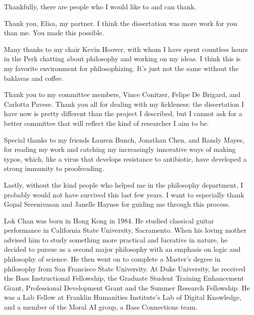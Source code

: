 \documentclass[PhD]{dukethesis2006}
\begin{document}
Thankfully, there are people who I would like to and can thank.

Thank you, Elisa, my partner. I think the dissertation was more work for you than me. You made this possible. 

Many thanks to my chair Kevin Hoover, with whom I have spent countless hours in the Perk chatting about philosophy and working on my ideas. I think this is my favorite environment for philosophizing. It's just not the same without the baklavas and coffee. 

Thank you to my committee members, Vince Conitzer, Felipe De Brigard, and Carlotta Pavese. Thank you all for dealing with my fickleness: the dissertation I have now is pretty different than the project I described,  but I cannot ask for a better committee that will reflect the kind of researcher I aim to be. 

Special thanks to my friends Lauren Bunch, Jonathan Chen, and Randy Mayes, for reading my work and catching my increasingly innovative ways of making typos, which, like a virus that develops resistance to antibiotic, have developed a strong immunity to proofreading.

Lastly, without the kind people who helped me in the philosophy department, I probably would not have survived this last few years. I want to especially thank Gopal Sreenivasan and Janelle Haynes for guiding me through this process. 









\printbibliography[heading=bibintoc]

\biography

	Lok Chan was born in Hong Kong in 1984. He studied classical guitar performance in California State University, Sacramento. When his loving mother advised him to study something more practical and lucrative in nature, he decided to pursue as a second major philosophy with an emphasis on logic and philosophy of science. He then went on to complete a Master's degree in philosophy from San Francisco State University. At Duke University, he received the Bass Instructional Fellowship, the Graduate Student Training Enhancement Grant, Professional Development Grant and the Summer Research Fellowship. He was a Lab Fellow at Franklin Humanities Institute's Lab of Digital Knowledge, and a member of the Moral AI group, a Bass Connections team.
\end{document}
